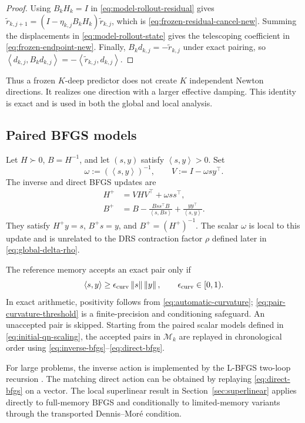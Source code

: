 \documentclass[10pt,leqno]{amsart}
\numberwithin{equation}{section}
\numberwithin{algorithm}{section}
\theoremstyle{remark}
\newcommand{\norm}[1]{\left\lVert #1 \right\rVert}
\newcommand{\ip}[2]{\left\langle #1,#2 \right\rangle}
\begin{document}
\begin{proof}
Using $B_kH_k=I$ in \eqref{eq:model-rollout-residual} gives
$\widetilde r_{k,j+1}=(I-\eta_{k,j}B_kH_k)\widetilde r_{k,j}$, which is \eqref{eq:frozen-residual-cancel-new}.  Summing the displacements in \eqref{eq:model-rollout-state} gives the telescoping coefficient in \eqref{eq:frozen-endpoint-new}.  Finally, $B_kd_{k,j}=-\widetilde r_{k,j}$ under exact pairing, so
$\ip{d_{k,j}}{B_kd_{k,j}}=-\ip{\widetilde r_{k,j}}{d_{k,j}}$.
\end{proof}

Thus a frozen $K$-deep predictor does not create $K$ independent Newton directions.  It realizes one direction with a larger effective damping.  This identity is exact and is used in both the global and local analysis.

\subsection{Paired BFGS models}
\label{sec:bfgs-model}

Let $H\succ0$, $B=H^{-1}$, and let $(s,y)$ satisfy $\ip{s}{y}>0$.  Set
\[
  \omega:=(\ip{s}{y})^{-1},
  \qquad
  V:=I-\omega sy^\top.
\]
The inverse and direct BFGS updates are
\begin{align}
    H^+&=VHV^\top+\omega ss^\top,
    \label{eq:inverse-bfgs}\\
    B^+&=B-\frac{Bss^\top B}{\ip{s}{Bs}}
           +\frac{yy^\top}{\ip{s}{y}}.
    \label{eq:direct-bfgs}
\end{align}
They satisfy $H^+y=s$, $B^+s=y$, and $B^+=(H^+)^{-1}$.  The scalar $\omega$ is local to this update and is unrelated to the DRS contraction factor $\rho$ defined later in \eqref{eq:global-delta-rho}.

The reference memory accepts an exact pair only if
\begin{equation}
\label{eq:pair-curvature-threshold}
  \ip{s}{y}\ge
  \epsilon_{\rm curv}\norm{s}\norm{y},
  \qquad \epsilon_{\rm curv}\in[0,1).
\end{equation}
In exact arithmetic, positivity follows from \eqref{eq:automatic-curvature}; \eqref{eq:pair-curvature-threshold} is a finite-precision and conditioning safeguard.  An unaccepted pair is skipped.  Starting from the paired scalar models defined in \eqref{eq:initial-qn-scaling}, the accepted pairs in $\mathcal M_k$ are replayed in chronological order using \eqref{eq:inverse-bfgs}--\eqref{eq:direct-bfgs}.

For large problems, the inverse action is implemented by the L-BFGS two-loop recursion \cite{LiuNocedal1989,ByrdNocedalSchnabel1994}.  The matching direct action can be obtained by replaying \eqref{eq:direct-bfgs} on a vector.  The local superlinear result in Section~\ref{sec:superlinear} applies directly to full-memory BFGS and conditionally to limited-memory variants through the transported Dennis--Mor\'e condition.
\end{document}
